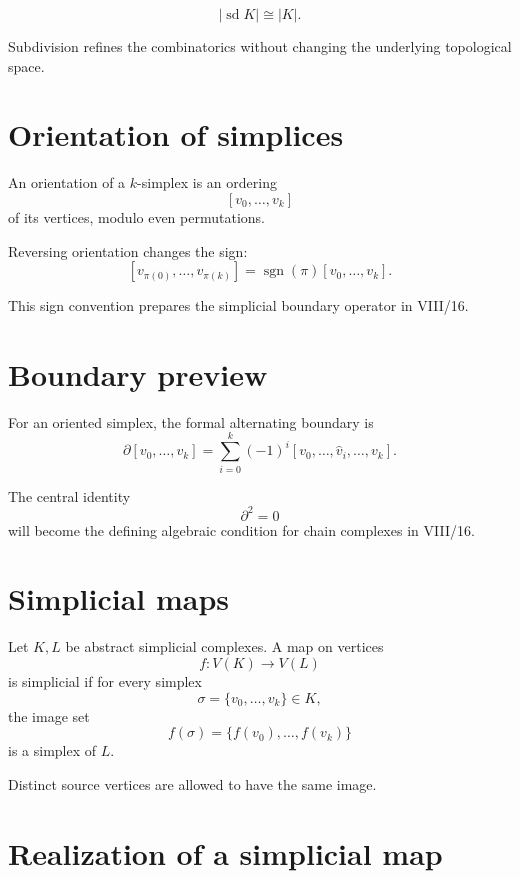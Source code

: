 \begin{theorem}
\label{thm:viii15-subdivision-homeomorphism}
\[
|\operatorname{sd}K|\cong|K|.
\]
\end{theorem}

Subdivision refines the combinatorics without changing the underlying
topological space.

\section{Orientation of simplices}

An orientation of a \(k\)-simplex is an ordering
\[
[v_0,\dots,v_k]
\]
of its vertices, modulo even permutations.

Reversing orientation changes the sign:
\[
[v_{\pi(0)},\dots,v_{\pi(k)}]
=
\operatorname{sgn}(\pi)[v_0,\dots,v_k].
\]

This sign convention prepares the simplicial boundary operator in VIII/16.

\section{Boundary preview}

For an oriented simplex, the formal alternating boundary is
\[
\partial[v_0,\dots,v_k]
=
\sum_{i=0}^k
(-1)^i
[v_0,\dots,\widehat v_i,\dots,v_k].
\]

The central identity
\[
\partial^2=0
\]
will become the defining algebraic condition for chain complexes in VIII/16.

\section{Simplicial maps}

\begin{definition}
\label{def:viii15-simplicial-map}
Let \(K,L\) be abstract simplicial complexes.  A map on vertices
\[
f:V(K)\to V(L)
\]
is simplicial if for every simplex
\[
\sigma=\{v_0,\dots,v_k\}\in K,
\]
the image set
\[
f(\sigma)=\{f(v_0),\dots,f(v_k)\}
\]
is a simplex of \(L\).
\end{definition}

Distinct source vertices are allowed to have the same image.

\section{Realization of a simplicial map}


